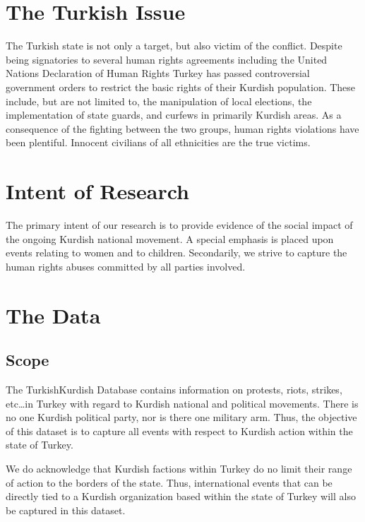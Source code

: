 \documentclass[letterpaper,10pt,english]{sphinxmanual}
\begin{document}
\section{The Turkish Issue}
\label{\detokenize{introduction:the-turkish-issue}}
\sphinxAtStartPar
The Turkish state is not only a target, but also victim of the conflict. Despite being signatories to several human rights agreements \textendash{} including the United Nations Declaration of Human Rights \textendash{} Turkey has passed controversial government orders to restrict the basic rights of their Kurdish population. These include, but are not limited to, the manipulation of local elections, the implementation of state guards, and curfews in primarily Kurdish areas. As a consequence of the fighting between the two groups, human rights violations have been plentiful.  Innocent civilians of all ethnicities are the true victims.


\section{Intent of Research}
\label{\detokenize{introduction:intent-of-research}}
\sphinxAtStartPar
The primary intent of our research is to provide evidence of the social impact of the ongoing Kurdish national movement.  A special emphasis is placed upon events relating to women and to children. Secondarily, we strive to capture the human rights abuses committed by all parties involved.


\section{The Data}
\label{\detokenize{introduction:the-data}}

\subsection{Scope}
\label{\detokenize{introduction:scope}}
\sphinxAtStartPar
The Turkish\sphinxhyphen{}Kurdish Database contains information on protests, riots, strikes, etc…in Turkey with regard to Kurdish national and political movements.  There is no one Kurdish political party, nor is there one military arm.  Thus, the objective of this dataset is to capture all events with respect to Kurdish action within the state of Turkey.

\sphinxAtStartPar
We do acknowledge that Kurdish factions within Turkey do no limit their range of action to the borders of the state.  Thus, international events that can be directly tied to a Kurdish organization based within the state of Turkey will also be captured in this dataset.
\end{document}
